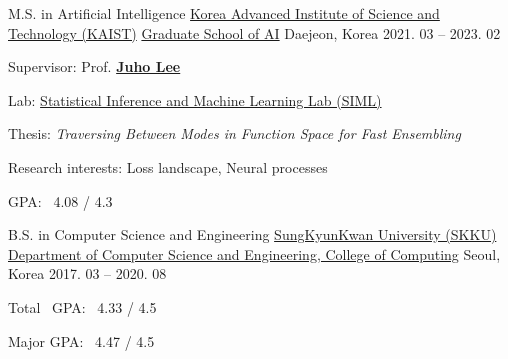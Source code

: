 \documentclass[11pt, a4paper]{cv}
\begin{document}
\makecvheader


\begin{cventries}

  \cveducation
    {M.S. in Artificial Intelligence} %
    {\href{https://www.kaist.ac.kr/en/}{Korea Advanced Institute of Science and Technology (KAIST)}} %
    {\href{https://gsai.kaist.ac.kr}{Graduate School of AI}} %
    {Daejeon, Korea} %
    {2021. 03 -- 2023. 02} %
    {
      \begin{cvitems} %
        \item {Supervisor: Prof. \href{https://juho-lee.github.io}{\bfseries\color{graytext} Juho Lee}}
        \item {Lab: \href{https://siml.kaist.ac.kr}{Statistical Inference and Machine Learning Lab (SIML)}}
        \item {Thesis: \textit{Traversing Between Modes in Function Space for Fast Ensembling}}
        \item {Research interests: Loss landscape, Neural processes}
        \item {GPA: \ 4.08 / 4.3}
      \end{cvitems}
    }

  \cveducation
    {B.S. in Computer Science and Engineering} %
    {\href{https://www.skku.edu/eng/}{SungKyunKwan University (SKKU)}} %
    {\href{https://cs.skku.edu/en/college/department/cse_intro}{Department of Computer Science and Engineering, College of Computing}} %
    {Seoul, Korea} %
    {2017. 03 -- 2020. 08} %
    {
      \begin{cvitems} %
        \item {Total \ GPA: \ 4.33 / 4.5}
        \item {Major GPA: \ 4.47 / 4.5}
      \end{cvitems}
    }

\end{cventries}
\end{document}
